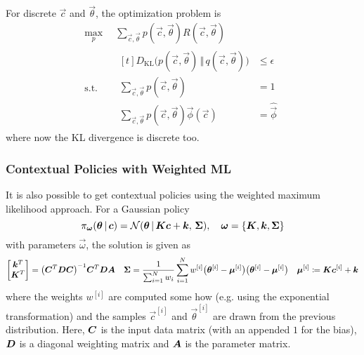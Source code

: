 				For discrete \(\vec{c}\) and \(\vec{\theta}\), the optimization problem is
				\begin{equation*}
					\begin{aligned}
						\max_p \,           & \sum_{\vec{c}, \vec{\theta}} p(\vec{c}, \vec{\theta}) R(\vec{c}, \vec{\theta}) \\
						\mathrm{s.t.} \quad &
						\begin{aligned}[t]
							D_\mathrm{KL}\big( p(\vec{c}, \vec{\theta}) \,\Vert\, q(\vec{c}, \vec{\theta}) \big) & \leq \epsilon      \\
							\sum_{\vec{c}, \vec{\theta}} p(\vec{c}, \vec{\theta})                                & = 1                \\
							\sum_{\vec{c}, \vec{\theta}} p(\vec{c}, \vec{\theta}) \vec{\phi}(\vec{c})            & = \hat{\vec{\phi}}
						\end{aligned}
					\end{aligned}
				\end{equation*}
				where now the KL divergence is discrete too.

			\subsubsection{Contextual Policies with Weighted ML}
				It is also possible to get contextual policies using the weighted maximum likelihood approach. For a Gaussian policy
				\begin{equation*}
					\pi_{\bm{\omega}}(\bm{\theta} \,\vert\, \bm{c}) = \mathcal{N}(\bm{\theta} \,\vert\, \bm{K} \bm{c} + \bm{k},\, \bm{\Sigma}),\quad \bm{\omega} = \{ \bm{K}, \bm{k}, \bm{\Sigma} \}
				\end{equation*}
				with parameters \(\vec{\omega}\), the solution is given as
				\begin{align*}
					\begin{bmatrix}
						\bm{k}^T \\
						\bm{K}^T
					\end{bmatrix} = \big( \bm{C}^T \bm{D} \bm{C} \big)^{-1} \bm{C}^T \bm{D} \bm{A}
					 &  &
					\bm{\Sigma} = \frac{1}{\sum_{i = 1}^{N} w_i} \sum_{i = 1}^{N} w^{[i]} \big( \bm{\theta}^{[i]} - \bm{\mu}^{[i]} \big) \big( \bm{\theta}^{[i]} - \bm{\mu}^{[i]} \big)
					 &  &
					\bm{\mu}^{[i]} \coloneqq \bm{K} \bm{c}^{[i]} + \bm{k}
				\end{align*}
				where the weights \( w^{[i]} \) are computed some how (e.g. using the exponential transformation) and the samples \( \vec{c}^{[i]} \) and \( \vec{\theta}^{[i]} \) are drawn from the previous distribution. Here, \(\bm{C}\) is the input data matrix (with an appended \(1\) for the bias), \(\bm{D}\) is a diagonal weighting matrix and \(\bm{A}\) is the parameter matrix.

